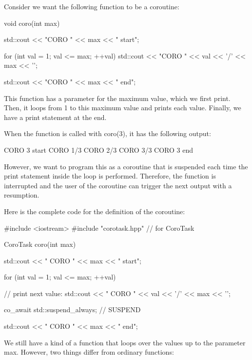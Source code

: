 
Consider we want the following function to be a coroutine:

\begin{cpp}
void coro(int max)
{
	std::cout << "CORO " << max << " start\n";
	
	for (int val = 1; val <= max; ++val) {
		std::cout << "CORO " << val << '/' << max << '\n';
	}
	
	std::cout << "CORO " << max << " end\n";
}
\end{cpp}

This function has a parameter for the maximum value, which we first print. Then, it loops from 1 to this maximum value and prints each value. Finally, we have a print statement at the end.

When the function is called with coro(3), it has the following output:

\begin{shell}
CORO 3 start
CORO 1/3
CORO 2/3
CORO 3/3
CORO 3 end
\end{shell}

However, we want to program this as a coroutine that is suspended each time the print statement inside the loop is performed. Therefore, the function is interrupted and the user of the coroutine can trigger the next output with a resumption.


Here is the complete code for the definition of the coroutine:


\begin{cpp}
#include <iostream>
#include "corotask.hpp" // for CoroTask

CoroTask coro(int max)
{
	std::cout << "             CORO " << max << " start\n";
	
	for (int val = 1; val <= max; ++val) {
		// print next value:
		std::cout << "          CORO " << val << '/' << max << '\n';
		
		co_await std::suspend_always{}; // SUSPEND
	}
	
	std::cout << " CORO " << max << " end\n";
}
\end{cpp}

We still have a kind of a function that loops over the values up to the parameter max. However, two things differ from ordinary functions:

